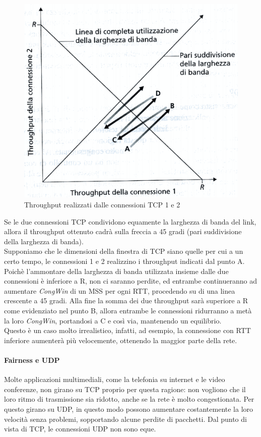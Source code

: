 \documentclass[11pt,a4paper]{article}
\begin{document}
\begin{figure}
	\includegraphics[scale=0.6]{img/048.png}
	\caption{Throughput realizzati dalle connessioni TCP 1 e 2}
\end{figure}
Se le due connessioni TCP condividono equamente la larghezza di banda del link, allora il throughput ottenuto cadrà sulla freccia a 45 gradi (pari suddivisione della larghezza di banda). \\
Supponiamo che le dimensioni della finestra di TCP siano quelle per cui a un certo tempo, le connessioni 1 e 2 realizzino i throughput indicati dal punto A. Poichè l'ammontare della larghezza di banda utilizzata insieme dalle due connessioni è inferiore a R, non ci saranno perdite, ed entrambe continueranno ad aumentare \emph{CongWin} di un MSS per ogni RTT, procedendo su di una linea crescente a 45 gradi. Alla fine la somma dei due throughput sarà superiore a R come evidenziato nel punto B, allora entrambe le connessioni ridurranno a metà la loro \emph{CongWin}, portandosi a C e così via, mantenendo un equilibrio. \\
Questo è un caso molto irrealistico, infatti, ad esempio, la connessione con RTT inferiore aumenterà più velocemente, ottenendo la maggior parte della rete.
\paragraph{Fairness e UDP}
Molte applicazioni multimediali, come la telefonia su internet e le video conferenze, non girano su TCP proprio per questa ragione: non vogliono che il loro ritmo di trasmissione sia ridotto, anche se la rete è molto congestionata. Per questo girano su UDP, in questo modo possono aumentare costantemente la loro velocità senza problemi, sopportando alcune perdite di pacchetti. Dal punto di vista di TCP, le connessioni UDP non sono eque.
\end{document}
